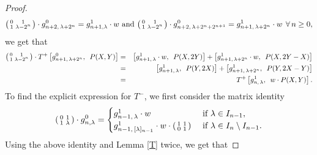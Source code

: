 \documentclass[11pt, reqno]{amsart}
\numberwithin{equation}{section}
\theoremstyle{definition}
\theoremstyle{remark}
\theoremstyle{definition}
\theoremstyle{remark}
\theoremstyle{remark}
\begin{document}
\begin{proof}
\begin{equation}
     \begin{psmallmatrix}
    0 & 1\\
    1 & \lambda-2^n
\end{psmallmatrix}\cdot g_{n+2,\,\lambda+2^n}^{0} = g_{n+1,\lambda}^{1}\cdot w \text{ and } 
    \begin{psmallmatrix}
    0 & 1\\
    1 & \lambda-2^n
\end{psmallmatrix} \cdot g_{n+2,\, \lambda+2^{n} +2^{n+1}}^{0} = g_{n+1,\,\lambda+2^n}^{1} \cdot w \hspace{1.5mm}\forall\, n \geq 0,
    \end{equation}
     we get that
    \begin{eqnarray*}
     \begin{psmallmatrix}
    0 & 1\\
    1 & \lambda-2^n
\end{psmallmatrix}
\cdot T^+\left[g_{n+1,\,\lambda+2^n}^{0},\enspace P(X,Y)\right]&= & \left[g_{n+1,\,\lambda}^{1}\cdot w, \enspace P(X,2Y)\right] + \left[g_{n+1,\,\lambda+2^n}^{1}\cdot w, \enspace P(X,2Y-X)\right]\\
    &=& \left[g_{n+1,\,\lambda}^{1} , \enspace P(Y,2X)\right] + \left[g_{n+1,\,\lambda +2^n}^{1}, \enspace P(Y,2X-Y)\right]\\
     &=& T^+\left[g_{n,\,\lambda}^{1}, \enspace  w\cdot P(X,Y)\right].   
    \end{eqnarray*}
To find the explicit expression for $T^{-}$, we first consider the matrix identity
\begin{equation*}
\begin{psmallmatrix}
    0 & 1\\
    1 & \lambda
\end{psmallmatrix} \cdot g_{n,\lambda}^{0} = \begin{cases}g_{n-1,\,\lambda}^{1}\cdot w &\text{ if } \lambda \in I_{n-1},\\
g_{n-1,\,[\lambda]_{n-1}}^{1}\cdot w \cdot \begin{psmallmatrix}
    1 & 1\\
    0 & 1
\end{psmallmatrix}& \text{ if } \lambda \in I_{n}\setminus I_{n-1}.
\end{cases}
\end{equation*}
Using the above identity and Lemma \ref{T} twice, we get that

\end{proof}
\end{document}
